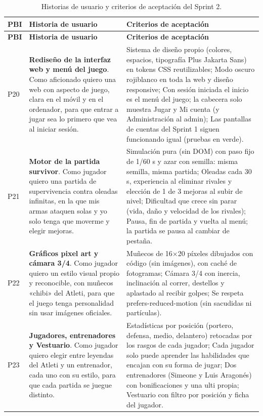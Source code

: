 {\small
\begin{longtable}{@{}L{0.8cm} L{6.4cm} L{6.6cm}@{}}
\caption{Historias de usuario y criterios de aceptación del Sprint 2.}\label{tab:sprint2-hu}\\
\toprule
\textbf{PBI} & \textbf{Historia de usuario} & \textbf{Criterios de aceptación} \\ \midrule \endfirsthead
\toprule
\textbf{PBI} & \textbf{Historia de usuario} & \textbf{Criterios de aceptación} \\ \midrule \endhead
P20 & \textbf{Rediseño de la interfaz web y menú del juego}. Como aficionado quiero una web con aspecto de juego, clara en el móvil y en el ordenador, para que entrar a jugar sea lo primero que vea al iniciar sesión. & Sistema de diseño propio (colores, espacios, tipografía Plus Jakarta Sans) en tokens CSS reutilizables; Modo oscuro rojiblanco en toda la web y diseño responsive; Con sesión iniciada el inicio es el menú del juego; la cabecera solo muestra Jugar y Mi cuenta (y Administración al admin); Las pantallas de cuentas del Sprint 1 siguen funcionando igual (pruebas en verde). \\
P21 & \textbf{Motor de la partida survivor}. Como jugador quiero una partida de supervivencia contra oleadas infinitas, en la que mis armas ataquen solas y yo solo tenga que moverme y elegir mejoras. & Simulación pura (sin DOM) con paso fijo de 1/60 s y azar con semilla: misma semilla, misma partida; Oleadas cada 30 s, experiencia al eliminar rivales y elección de 1 de 3 mejoras al subir de nivel; Dificultad que crece sin parar (vida, daño y velocidad de los rivales); Pausa, fin de partida y vuelta al menú; la partida se pausa al cambiar de pestaña. \\
P22 & \textbf{Gráficos pixel art y cámara 3/4}. Como jugador quiero un estilo visual propio y reconocible, con muñecos «chibi» del Atleti, para que el juego tenga personalidad sin usar imágenes oficiales. & Muñecos de 16×20 píxeles dibujados con código (sin imágenes), con caché de fotogramas; Cámara 3/4 con inercia, inclinación al correr, destellos y aplastado al recibir golpes; Se respeta prefers-reduced-motion (sin sacudidas ni partículas). \\
P23 & \textbf{Jugadores, entrenadores y Vestuario}. Como jugador quiero elegir entre leyendas del Atleti y un entrenador, cada uno con su estilo, para que cada partida se juegue distinto. & Estadísticas por posición (portero, defensa, medio, delantero) retocadas por los rasgos de cada jugador; Cada jugador solo puede aprender las habilidades que encajan con su forma de jugar; Dos entrenadores (Simeone y Luis Aragonés) con bonificaciones y una ulti propia; Vestuario con filtro por posición y ficha del jugador. \\

\end{longtable}}
